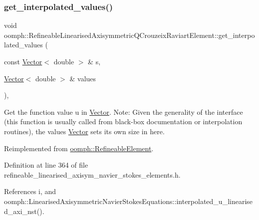 \subsubsection{\texorpdfstring{get\+\_\+interpolated\+\_\+values()}{get\_interpolated\_values()}\hspace{0.1cm}{\footnotesize\ttfamily [1/2]}}
{\footnotesize\ttfamily void oomph\+::\+Refineable\+Linearised\+Axisymmetric\+Q\+Crouzeix\+Raviart\+Element\+::get\+\_\+interpolated\+\_\+values (\begin{DoxyParamCaption}\item[{const \hyperlink{classoomph_1_1Vector}{Vector}$<$ double $>$ \&}]{s,  }\item[{\hyperlink{classoomph_1_1Vector}{Vector}$<$ double $>$ \&}]{values }\end{DoxyParamCaption})\hspace{0.3cm}{\ttfamily [inline]}, {\ttfamily [virtual]}}



Get the function value u in \hyperlink{classoomph_1_1Vector}{Vector}. Note\+: Given the generality of the interface (this function is usually called from black-\/box documentation or interpolation routines), the values \hyperlink{classoomph_1_1Vector}{Vector} sets its own size in here. 



Reimplemented from \hyperlink{classoomph_1_1RefineableElement_ad9a4f92880668a2373326d8306365c43}{oomph\+::\+Refineable\+Element}.



Definition at line 364 of file refineable\+\_\+linearised\+\_\+axisym\+\_\+navier\+\_\+stokes\+\_\+elements.\+h.



References i, and oomph\+::\+Linearised\+Axisymmetric\+Navier\+Stokes\+Equations\+::interpolated\+\_\+u\+\_\+linearised\+\_\+axi\+\_\+nst().

\mbox{\label{classoomph_1_1RefineableLinearisedAxisymmetricQCrouzeixRaviartElement_a46c6b74a900afc0038bcd4f6c33c6c47}} 
